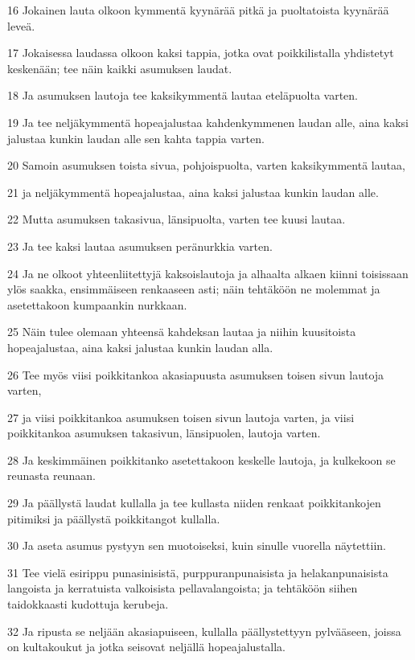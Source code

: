\par 16 Jokainen lauta olkoon kymmentä kyynärää pitkä ja puoltatoista kyynärää leveä.
\par 17 Jokaisessa laudassa olkoon kaksi tappia, jotka ovat poikkilistalla yhdistetyt keskenään; tee näin kaikki asumuksen laudat.
\par 18 Ja asumuksen lautoja tee kaksikymmentä lautaa eteläpuolta varten.
\par 19 Ja tee neljäkymmentä hopeajalustaa kahdenkymmenen laudan alle, aina kaksi jalustaa kunkin laudan alle sen kahta tappia varten.
\par 20 Samoin asumuksen toista sivua, pohjoispuolta, varten kaksikymmentä lautaa,
\par 21 ja neljäkymmentä hopeajalustaa, aina kaksi jalustaa kunkin laudan alle.
\par 22 Mutta asumuksen takasivua, länsipuolta, varten tee kuusi lautaa.
\par 23 Ja tee kaksi lautaa asumuksen peränurkkia varten.
\par 24 Ja ne olkoot yhteenliitettyjä kaksoislautoja ja alhaalta alkaen kiinni toisissaan ylös saakka, ensimmäiseen renkaaseen asti; näin tehtäköön ne molemmat ja asetettakoon kumpaankin nurkkaan.
\par 25 Näin tulee olemaan yhteensä kahdeksan lautaa ja niihin kuusitoista hopeajalustaa, aina kaksi jalustaa kunkin laudan alla.
\par 26 Tee myös viisi poikkitankoa akasiapuusta asumuksen toisen sivun lautoja varten,
\par 27 ja viisi poikkitankoa asumuksen toisen sivun lautoja varten, ja viisi poikkitankoa asumuksen takasivun, länsipuolen, lautoja varten.
\par 28 Ja keskimmäinen poikkitanko asetettakoon keskelle lautoja, ja kulkekoon se reunasta reunaan.
\par 29 Ja päällystä laudat kullalla ja tee kullasta niiden renkaat poikkitankojen pitimiksi ja päällystä poikkitangot kullalla.
\par 30 Ja aseta asumus pystyyn sen muotoiseksi, kuin sinulle vuorella näytettiin.
\par 31 Tee vielä esirippu punasinisistä, purppuranpunaisista ja helakanpunaisista langoista ja kerratuista valkoisista pellavalangoista; ja tehtäköön siihen taidokkaasti kudottuja kerubeja.
\par 32 Ja ripusta se neljään akasiapuiseen, kullalla päällystettyyn pylvääseen, joissa on kultakoukut ja jotka seisovat neljällä hopeajalustalla.

